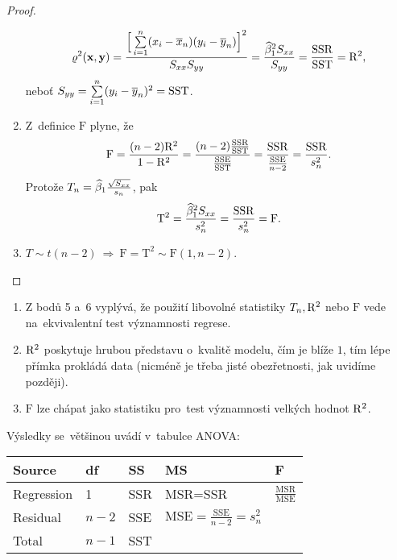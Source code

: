 \begin{theorem}
\begin{proof}
\begin{enumerate}
		$$ \varrho^2(\textbf{x},\textbf{y})=\frac{\Big[\sum\limits_{i=1}^{n}(x_i-\overline{x}_n)(y_i-\overline{y}_n)\Big]^2}{S_{xx}S_{yy}}=\frac{\widehat{\beta}_1^2 S_{xx}}{S_{yy}}=\frac{\mathrm{SSR}}{\mathrm{SST}}=\mathrm{R}^2, $$ neboť $S_{yy}=\sum\limits_{i=1}^{n}(y_i-\overline{y}_n)^2=\mathrm{SST}$.
		\item Z~definice $\mathrm{F}$ plyne, že 
		$$ \mathrm{F}=\frac{(n-2)\mathrm{R}^2}{1-\mathrm{R}^2}=\frac{(n-2)\frac{\mathrm{SSR}}{\mathrm{SST}}}{\frac{\mathrm{SSE}}{\mathrm{SST}}}=\frac{\mathrm{SSR}}{\frac{\mathrm{SSE}}{n-2}}=\frac{\mathrm{SSR}}{s_n^2}. $$ Protože $T_n=\widehat{\beta}_1\frac{\sqrt{S_{xx}}}{s_n}$, pak $$ \mathrm{T}^2=\frac{\widehat{\beta}_1^2 S_{xx}}{s_n^2}=\frac{\mathrm{SSR}}{s_n^2}=\mathrm{F}. $$
		\item $T\sim t(n-2)~\Rightarrow~\mathrm{F}=\mathrm{T}^2\sim\mathrm{F}(1,n-2)$.
		
	\end{enumerate}
\end{proof}
\end{theorem}
\begin{remark}
\begin{enumerate}
	\item 	Z bodů 5 a~6 vyplývá, že použití libovolné statistiky $T_n,\mathrm{R}^2$ nebo $\mathrm{F}$ vede na~ekvivalentní test významnosti regrese.
	\item $\mathrm{R}^2$ poskytuje hrubou představu o~kvalitě modelu, čím je blíže $1$, tím lépe přímka prokládá data (nicméně je třeba jisté obezřetnosti, jak uvidíme později).
	\item $\mathrm{F}$ lze chápat jako statistiku pro~test významnosti velkých hodnot $\mathrm{R}^2$.
\end{enumerate}
\end{remark}
Výsledky se~většinou uvádí v~tabulce ANOVA:
\begin{table}[h]\label{ANOVA_table}
	\begin{tabular}{|lllll|}
	\hline
	Source & df & SS & MS & F\\
	\hline
	Regression & 1 & SSR & MSR=SSR & $\frac{\mathrm{MSR}}{\mathrm{MSE}}$ \\
	Residual & $n-2$ & SSE & $\mathrm{MSE}=\frac{\mathrm{SSE}}{n-2}=s_n^2$ & \\
	Total & $n-1$ & SST & & \\ \hline
\end{tabular}
\end{table}

